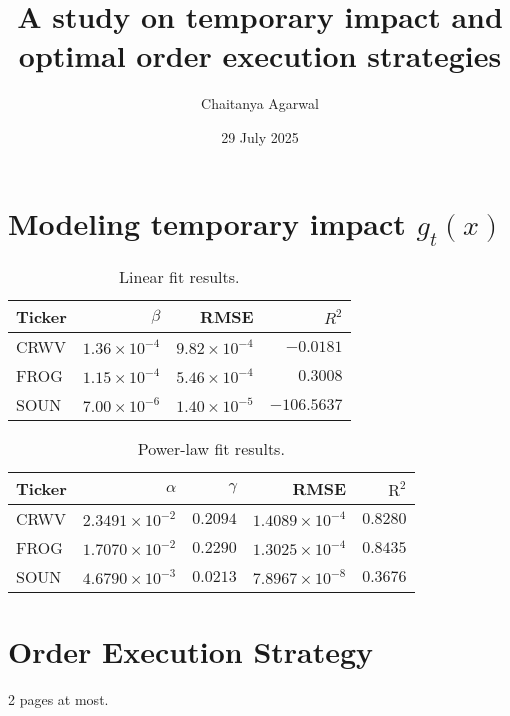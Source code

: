 \documentclass[12pt, letterpaper]{article}
\title{A study on temporary impact and optimal order execution strategies}
\author{Chaitanya Agarwal}
\date{29 July 2025}
\begin{document}
\maketitle


\section{Modeling temporary impact $g_t(x)$}

\begin{table}[ht]
\centering
\begin{tabular}{lrrr}
\toprule
Ticker & $\beta$ & RMSE & $R^2$ \\
\midrule
CRWV & $1.36\times10^{-4}$ & $9.82\times10^{-4}$ & $-0.0181$ \\
FROG & $1.15\times10^{-4}$ & $5.46\times10^{-4}$ & $0.3008$  \\
SOUN & $7.00\times10^{-6}$ & $1.40\times10^{-5}$ & $-106.5637$ \\
\bottomrule
\end{tabular}
\caption{Linear fit results.}
\end{table}

\begin{table}[ht]
\centering
\begin{tabular}{lrrrr}
\toprule
Ticker & $\alpha$ & $\gamma$ & RMSE & $\mathrm{R}^2$ \\
\midrule
CRWV & $2.3491\times10^{-2}$ & $0.2094$ & $1.4089\times10^{-4}$ & $0.8280$ \\
FROG & $1.7070\times10^{-2}$ & $0.2290$ & $1.3025\times10^{-4}$ & $0.8435$ \\
SOUN & $4.6790\times10^{-3}$ & $0.0213$ & $7.8967\times10^{-8}$ & $0.3676$ \\
\bottomrule
\end{tabular}
\caption{Power-law fit results.}
\end{table}

\section{Order Execution Strategy}

2 pages at most.
\end{document}
